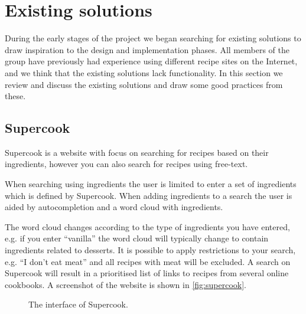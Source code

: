 \section{Existing solutions}\label{sec:exist}

During the early stages of the project we began searching for existing solutions to draw inspiration to the design and implementation phases. All members of the group have previously had experience using different recipe sites on the Internet, and we think that the existing solutions lack functionality. In this section we review and discuss the existing solutions and draw some good practices from these.

\subsection{Supercook}
Supercook\cite{supercook} is a website with focus on searching for recipes based on their ingredients, however you can also search for recipes using free-text. 

When searching using ingredients the user is limited to enter a set of ingredients which is defined by Supercook. When adding ingredients to a search the user is aided by autocompletion and a word cloud with ingredients.

The word cloud changes according to the type of ingredients you have entered, e.g. if you enter ``vanilla'' the word cloud will typically change to contain ingredients related to desserts. It is possible to apply restrictions to your search, e.g. ``I don't eat meat'' and all recipes with meat will be excluded. A search on Supercook will result in a prioritised list of links to recipes from several online cookbooks. A screenshot of the website is shown in \autoref{fig:supercook}.

\begin{figure}[H]
\centering
{}
\caption{The interface of Supercook.}
\label{fig:supercook}
\end{figure}

